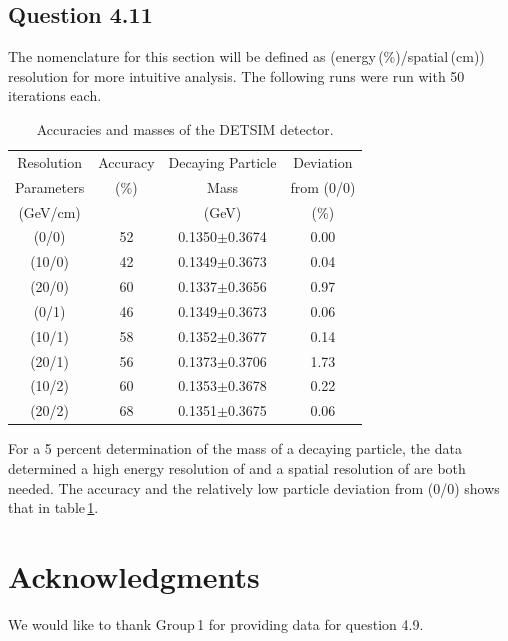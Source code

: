 \documentclass[aps,prl,twocolumn,superscriptaddress,nofootinbib]{revtex4-1}
\begin{document}
\subsection{Question 4.11}

The nomenclature for this section will be defined as (energy\,(\%)/spatial\,(cm)) resolution for more intuitive analysis. The following runs were run with 50 iterations each. 

\begin{table}[h!] 
\caption{Accuracies and masses of the DETSIM detector.}
\label{t1}   %
 \begin{center}   %
    \begin{tabular}{|c|c|c|c|} \hline   %
    Resolution& Accuracy& Decaying Particle & Deviation    \\
Parameters& (\%) & Mass   & from (0/0)   \\
(GeV/cm)& &(GeV)        & (\%)    \\ \hline \hline \hline

(0/0)& 52  & 0.1350$\pm$0.3674  & 0.00   \\ \hline
(10/0)& 42 &0.1349$\pm$0.3673 & 0.04   \\ \hline
(20/0) & 60 &0.1337$\pm$0.3656   & 0.97   \\ \hline
(0/1)  & 46 &0.1349$\pm$0.3673   &0.06   \\ \hline
(10/1) & 58  &0.1352$\pm$0.3677   &0.14   \\ \hline
(20/1) & 56  &0.1373$\pm$0.3706   &1.73   \\ \hline
(10/2) & 60  &0.1353$\pm$0.3678   &0.22   \\ \hline
(20/2) & 68 &0.1351$\pm$0.3675   &0.06  \\ \hline
     \end{tabular}
  \end{center}
\end{table}


\indent For a 5 percent determination of the mass of a decaying particle, the data determined a high energy resolution of  and a spatial resolution of  are both needed. The accuracy and the relatively low particle deviation from (0/0) shows that in table\,\ref{t1}.



\section{Acknowledgments}
We would like to thank Group\,1 for providing data for question 4.9.
\end{document}
